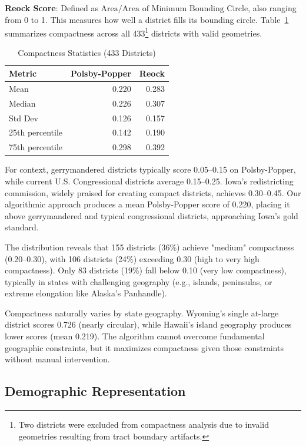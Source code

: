 \textbf{Reock Score}: Defined as $\text{Area} / \text{Area of Minimum Bounding Circle}$, also ranging from 0 to 1. This measures how well a district fills its bounding circle.
Table~\ref{tab:compactness_stats} summarizes compactness across all 433\footnote{Two districts were excluded from compactness analysis due to invalid geometries resulting from tract boundary artifacts.} districts with valid geometries.

\begin{table}[h]
\centering
\caption{Compactness Statistics (433 Districts)}
\label{tab:compactness_stats}
\begin{tabular}{lrr}
\toprule
\textbf{Metric} & \textbf{Polsby-Popper} & \textbf{Reock} \\
\midrule
Mean & 0.220 & 0.283 \\
Median & 0.226 & 0.307 \\
Std Dev & 0.126 & 0.157 \\
25th percentile & 0.142 & 0.190 \\
75th percentile & 0.298 & 0.392 \\
\bottomrule
\end{tabular}
\end{table}

For context, gerrymandered districts typically score 0.05--0.15 on Polsby-Popper, while current U.S. Congressional districts average 0.15--0.25. Iowa's redistricting commission, widely praised for creating compact districts, achieves 0.30--0.45. Our algorithmic approach produces a mean Polsby-Popper score of 0.220, placing it above gerrymandered and typical congressional districts, approaching Iowa's gold standard.

The distribution reveals that 155 districts (36\%) achieve "medium" compactness (0.20--0.30), with 106 districts (24\%) exceeding 0.30 (high to very high compactness). Only 83 districts (19\%) fall below 0.10 (very low compactness), typically in states with challenging geography (e.g., islands, peninsulas, or extreme elongation like Alaska's Panhandle).

Compactness naturally varies by state geography. Wyoming's single at-large district scores 0.726 (nearly circular), while Hawaii's island geography produces lower scores (mean 0.219). The algorithm cannot overcome fundamental geographic constraints, but it maximizes compactness given those constraints without manual intervention.
\subsection{Demographic Representation}

